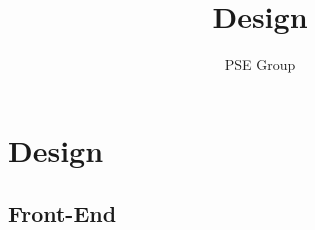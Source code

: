 \documentclass[twoside, english, draft]{design}
\author{PSE Group}
\title{
Design}
\begin{document}
\nocite{*}

\setpdf

\maketitle


\thispagestyle{empty}
\begin{abstract}
\thispagestyle{empty}
\end{abstract}

\thispagestyle{empty}
\newpage
\thispagestyle{empty}
\tableofcontents
\cleardoublepage
\setcounter{page}{1}


\section{Design}\label{sec:intro}
\subsection{Front-End}
\end{document}

